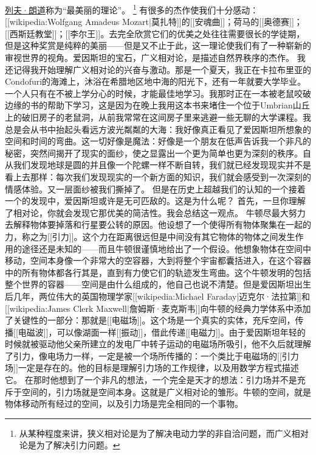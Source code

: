 \href{https://en.wikipedia.org/wiki/Lev_Davidovich_Landau}{列夫·朗道}称为“最美丽的理论”。
\footnote[2]
{
从某种程度来讲，狭义相对论是为了解决电动力学的非自洽问题，而广义相对论是为了解决引力问题。
}
    有很多的杰作使我们十分感动：[[wikipedia:Wolfgang Amadeus Mozart|莫扎特]]的[[安魂曲]]；荷马的[[奥德赛]]；[[西斯廷教堂]]；[[李尔王]]。去完全欣赏它们的优美之处往往需要很长的学徒期，但是这种奖赏是纯粹的美丽——但是又不止于此，这一理论使我们有了一种崭新的审视世界的视角。爱因斯坦的宝石，广义相对论，是描述自然界秩序的杰作。
    我还记得我开始理解广义相对论的兴奋与激动。那是一个夏天，我正在卡拉布里亚的Condofuri的海滩上，沐浴在希腊地区地中海的阳光下，还有一年就要大学毕业。一个人只有在不被上学分心的时候，才能最佳地学习。我那时正在一本被老鼠咬破边缘的书的帮助下学习，这是因为在晚上我用这本书来堵住一个位于Umbrian山丘上的破旧房子的老鼠洞，从前我常常在这间房子里来逃避一些无聊的大学课程。我总是会从书中抬起头看远方波光粼粼的大海：我好像真正看见了爱因斯坦所想象的空间和时间的弯曲。这一切好像是魔法：好像是一个朋友在低声告诉我一个非凡的秘密，突然间揭开了现实的面纱，使之显露出一个更为简单也更为深刻的秩序。自从我们发现地球是圆的并且像一个陀螺一样不断自转，我们就已经发现现实并不是看上去那样：每次我们发现现实的一个新方面的知识，我们就会感受到一次深刻的情感体验。又一层面纱被我们撕掉了。
    但是在历史上超越我们的认知的一个接着一个的发现中，爱因斯坦或许是无可匹敌的。这是为什么呢？
    首先，一旦你理解了相对论，你就会发现它那优美的简洁性。我会总结这一观点。
    牛顿尽最大努力去解释物体要掉落和行星要公转的原因。他设想了一个使得所有物体聚集在一起的力，称之为[[引力]]。这个力在距离很远但是中间没有其它物体的物体之间发生作用的途径还是未知的——而且牛顿很谨慎地给出了一个假设。他想象物体在空间中移动，空间本身像一个非常大的空容器，大到将整个宇宙都囊括进入，在这个容器中的所有物体都各行其是，直到有力使它们的轨迹发生弯曲。这个牛顿发明的包括整个世界的容器——空间是由什么组成的，他自己也说不清楚。但是爱因斯坦出生后几年，两位伟大的英国物理学家[[wikipedia:Michael Faraday|迈克尔·法拉第]]和[[wikipedia:James Clerk Maxwell|詹姆斯·麦克斯韦]]向牛顿的经典力学体系中添加了关键性的一部分：那就是[[电磁场]]。这个场是一个真实的实体，充斥空间，传播[[电磁波]]，可以像湖面一样[[振动]]，借此传递[[电磁力]]。由于爱因斯坦年轻的时候就被驱动他父亲所建立的发电厂中转子运动的电磁场所吸引，他不久后就理解了引力，像电场力一样，一定是被一个场所传播的：一个类比于电磁场的[[引力场]]一定是存在的。他的目标是理解引力场的工作规律，以及用数学方程式描述它。
    在那时他想到了一个非凡的想法，一个完全是天才的想法：引力场并不是充斥于空间的，引力场就是空间本身。这就是广义相对论的雏形。牛顿的空间，就是物体移动所有经过的空间，以及引力场是完全相同的一个事物。
